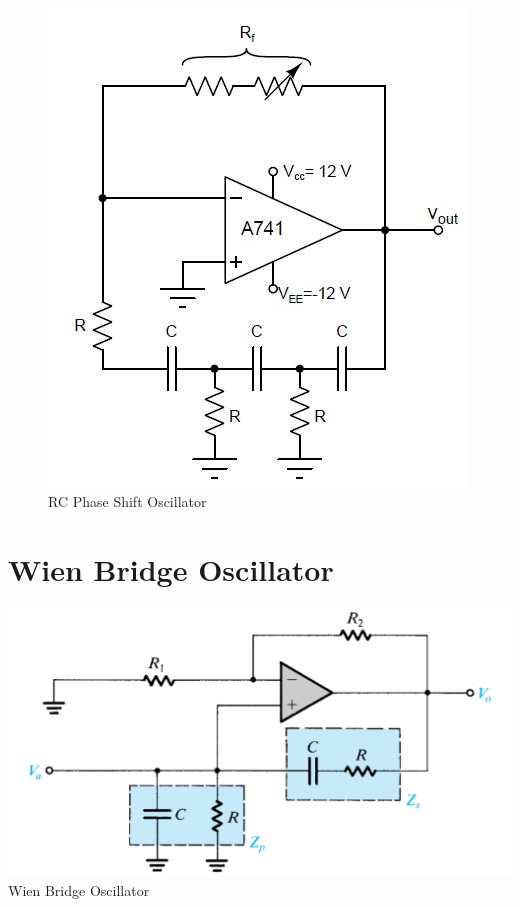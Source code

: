 \documentclass[12pt]{report}
\begin{document}
\begin{figure}[ht]
    \centering
    \includegraphics[scale=0.8]{figs/RC_Phase_shift.jpeg}
    \caption{RC Phase Shift Oscillator}
    \label{fig:theoryWien}
\end{figure}

\section{Wien Bridge Oscillator}
\label{sec:WienBridge}

\begin{center}
 \includegraphics[scale=0.4]{figs/theory_wien_bridge.png}\\
 Wien Bridge Oscillator \cite{Sedra}
\end{center}
\end{document}
